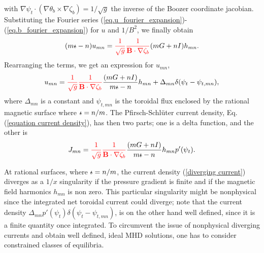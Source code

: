 \documentclass[my_thesis.tex]{subfiles}
\begin{document}
with $\nabla\psi_t\cdot(\nabla\theta_b\times\nabla\zeta_b) = 1/\sqrt{g}$ the inverse of the Boozer coordinate jacobian. Substituting the Fourier series (\ref{eq.u_fourier_expansion})-(\ref{eq.b_fourier_expansion}) for $u$ and $1/B^2$, we finally obtain
\begin{equation}
	(m\text{$\iota\!\!$-} - n)u_{mn} = {\color{red}\frac{1}{\sqrt{g}}\frac{1}{\mathbf{B}\cdot\nabla\zeta_b}}(mG + nI)h_{mn}.
\end{equation}
Rearranging the terms, we get an expression for $u_{mn}$,
\begin{equation}
	u_{mn} = {\color{red}\frac{1}{\sqrt{g}}\frac{1}{\mathbf{B}\cdot\nabla\zeta_b}}\frac{(mG + nI)}{m\text{$\iota\!\!$-} - n}h_{mn} + \Delta_{mn}\delta(\psi_t-\psi_{t,mn}),\label{eq.umn}
\end{equation}
where $\Delta_{mn}$ is a constant and $\psi_{t,mn}$ is the toroidal flux enclosed by the rational magnetic surface where $\text{$\iota\!\!$-}=n/m$. The Pfirsch-Schl\"uter current density, Eq.(\ref{equation current density}), has then two parts; one is a delta function, and the other is
\begin{equation}
	J_{mn} = {\color{red}\frac{1}{\sqrt{g}}\frac{1}{\mathbf{B}\cdot\nabla\zeta_b}}\frac{(mG + nI)}{m\text{$\iota\!\!$-} - n}h_{mn}p'(\psi_t).\label{diverging current}
\end{equation}

At rational surfaces, where $\text{$\iota\!\!$-}=n/m$, the current density (\ref{diverging current}) diverges as a $1/x$ singularity if the pressure gradient is finite and if the magnetic field harmonics $h_{mn}$ is non zero. This particular singularity might be nonphysical since the integrated net toroidal current could diverge; note that the current density $\Delta_{mn} p'(\psi_t) \delta(\psi_t-\psi_{t,mn})$, is on the other hand well defined, since it is a finite quantity once integrated. To circumvent the issue of nonphysical diverging currents and obtain well defined, ideal MHD solutions, one has to consider constrained classes of equilibria.
\end{document}
